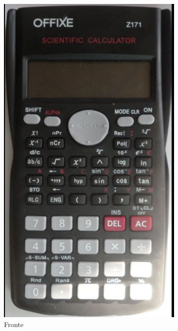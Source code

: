\begin{figure}
	\begin{subfigure}[b]{.5\linewidth}
	\centering\includegraphics{offixe/SAM_3719}%
		\caption{Fronte}\label{fig:OFFIXEfront}
	\end{subfigure}%
	\begin{subfigure}[b]{.5\linewidth}

\end{subfigure}
\end{figure}
